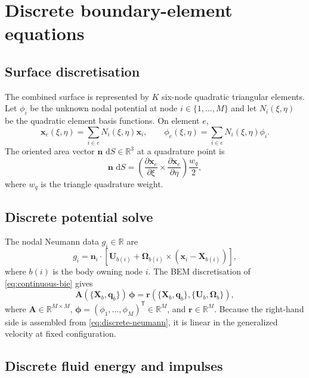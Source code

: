 \documentclass[11pt,a4paper]{article}
\newcommand{\R}{\mathbb{R}}
\newcommand{\dd}{\,\mathrm{d}}
\newcommand{\bn}{\bm{n}}
\newcommand{\bx}{\bm{x}}
\newcommand{\bX}{\bm{X}}
\newcommand{\bU}{\bm{U}}
\newcommand{\bOmega}{\bm{\Omega}}
\newcommand{\bA}{\bm{A}}
\newcommand{\quat}[1]{\mathbf{#1}}
\newcommand{\phiv}{\bm{\phi}}
\begin{document}
\section{Discrete boundary-element equations}

\subsection{Surface discretisation}

The combined surface is represented by $K$ six-node quadratic triangular
elements.  Let $\phi_i$ be the unknown nodal potential at node
$i\in\{1,\ldots,M\}$ and let $N_i(\xi,\eta)$ be the quadratic element basis
functions.  On element $e$,
\begin{equation}
  \bx_e(\xi,\eta)
  =
  \sum_{i\in e}N_i(\xi,\eta)\bx_i,\qquad
  \phi_e(\xi,\eta)
  =
  \sum_{i\in e}N_i(\xi,\eta)\phi_i .
\end{equation}
The oriented area vector $\bn\,\dd S\in\R^3$ at a quadrature point is
\begin{equation}
  \bn\,\dd S
  =
  \left(
    \frac{\partial\bx_e}{\partial\xi}
    \times
    \frac{\partial\bx_e}{\partial\eta}
  \right)
  \frac{w_q}{2},
  \label{eq:discrete-normal-area}
\end{equation}
where $w_q$ is the triangle quadrature weight.

\subsection{Discrete potential solve}

The nodal Neumann data $g_i\in\R$ are
\begin{equation}
  g_i
  =
  \bn_i\cdot
  \left[
    \bU_{b(i)}
    +
    \bOmega_{b(i)}\times(\bx_i-\bX_{b(i)})
  \right],
  \label{eq:discrete-neumann}
\end{equation}
where $b(i)$ is the body owning node $i$.  The BEM discretisation of
\eqref{eq:continuous-bie} gives
\begin{equation}
  \bA(\{\bX_b,\quat{q}_b\})\,\phiv
  =
  \bm{r}(\{\bX_b,\quat{q}_b\},\{\bU_b,\bOmega_b\}),
  \label{eq:discrete-bem}
\end{equation}
where $\bA\in\R^{M\times M}$,
$\phiv=(\phi_1,\ldots,\phi_M)^\mathsf{T}\in\R^M$, and
$\bm{r}\in\R^M$.  Because the right-hand side is assembled from
\eqref{eq:discrete-neumann}, it is linear in the generalized velocity at fixed
configuration.

\subsection{Discrete fluid energy and impulses}
\end{document}
